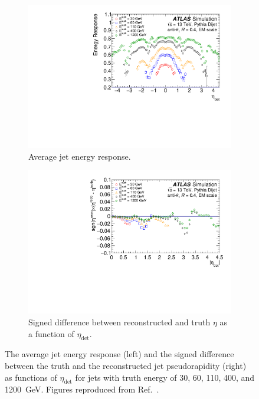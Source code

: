 \begin{figure}[htbp]
    \centering
    \begin{subfigure}{.49\textwidth}
      \centering
      \includegraphics[width=1.\textwidth]{figures/methods/jet_response-average.pdf}
      \caption{Average jet energy response.}
      \label{fig:methods:event-reconstruction:jets:smallr:response-average}
    \end{subfigure}
    \begin{subfigure}{.49\textwidth}
      \centering
      \includegraphics[width=1.\textwidth]{figures/methods/jet_response-eta.pdf}
      \caption{Signed difference between reconstructed and truth \(\eta\) as a function of \(\eta_{\text{det}}\).}
      \label{fig:methods:event-reconstruction:jets:smallr:response-eta}
    \end{subfigure}
    \caption{The average jet energy response (left) and the signed difference between the truth and the reconstructed jet pseudorapidity (right) as functions of \(\eta_{\text{det}}\) for jets with truth energy of \num{30}, \num{60}, \num{110}, \num{400}, and \SI{1200}{\giga\electronvolt}. Figures reproduced from Ref.~\cite{PERF-2016-04}.}
    \label{fig:methods:event-reconstruction:jets:smallr:response}
\end{figure}
